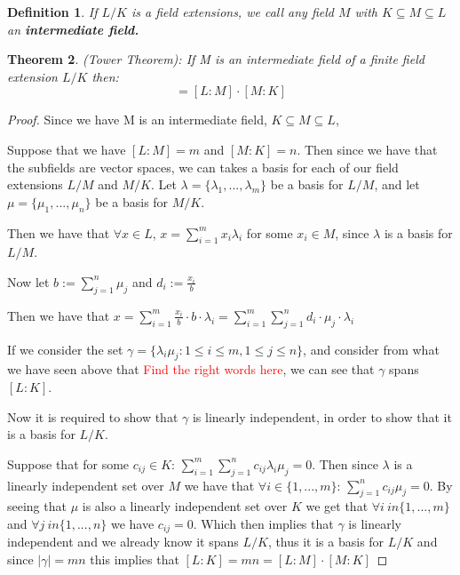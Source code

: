 \documentclass[12pt]{article}
\newtheorem{theorem}{Theorem}
\newtheorem{definition}[theorem]{Definition}
\begin{document}
\begin{definition}
    If $L/K$ is a field extensions, we call any field $M$ with $K \subseteq M \subseteq L$ an \textbf{intermediate field.}
\end{definition}
\begin{theorem}
(Tower Theorem): If M is an intermediate field of a finite field extension $L/K$ then:
\begin{equation*}
    [L:K] = [L:M]\cdot[M:K]
\end{equation*}
\end{theorem}
\begin{proof}
Since we have M is an intermediate field, $K \subseteq M \subseteq L$,

Suppose that we have $[L:M]=m$ and $[M:K]=n$. Then since we have that the subfields are vector spaces, we can takes a basis for each of our field extensions $L/M$ and $M/K$.
Let $\lambda = \{\lambda_1,...,\lambda_m\}$ be a basis for $L/M$, and let $\mu = \{\mu_1,...,\mu_n\}$ be a basis for $M/K$.

\noindent Then we have that $\forall x \in L$, $x = \sum^m_{i=1}x_i\lambda_i$ for some $x_i \in M$, since $\lambda$ is a basis for $L/M$.

\noindent Now let $b:=\sum^n_{j=1}\mu_j$ and $d_i:=\frac{x_i}{b}$

\noindent Then we have that $x=\sum^m_{i=1}\frac{x_i}{b}\cdot b \cdot \lambda_i = \sum^m_{i=1}\sum^n_{j=1}d_i\cdot \mu_j \cdot \lambda_i$

\noindent If we consider the set $\gamma=\{\lambda_i\mu_j : 1\leq i \leq m, 1\leq j \leq n\}$, and consider from what we have seen above that \textcolor{red}{Find the right words here}, we can see that $\gamma$ spans $[L:K]$.

Now it is required to show that $\gamma$ is linearly independent, in order to show that it is a basis for $L/K$.

Suppose that for some $c_{ij} \in K$: $\sum^m_{i=1} \sum^n_{j=1} c_{ij}\lambda_i\mu_j = 0 $. Then since $\lambda$ is a linearly independent set over $M$ we have that $\forall i \in \{1,...,m\}$:\hspace{0.2cm} $\sum^n_{j=1} c_{ij}\mu_j = 0 $. By seeing that $\mu$ is also a linearly independent set over $K$ we get that $\forall i \ in \{1,...,m\}$ and $\forall j \ in \{1,...,n\}$ we have $c_{ij} = 0$. Which then implies that $\gamma$ is linearly independent and we already know it spans $L/K$, thus it is a basis for $L/K$ and since $|\gamma|=mn$ this implies that $[L:K] = mn = [L:M]\cdot[M:K]$

\end{proof}
\end{document}
